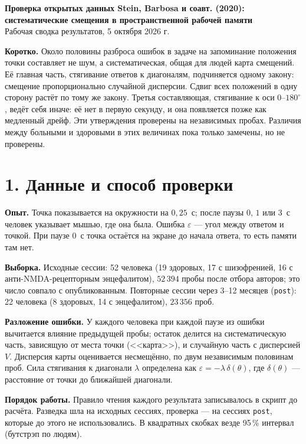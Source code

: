 \documentclass[10pt,a4paper]{article}
\newcommand{\gr}{^{\circ}}
\begin{document}
\begin{center}
{\Large\bfseries Проверка открытых данных Stein, Barbosa и соавт. (2020):\\[2pt]
систематические смещения в пространственной рабочей памяти}\\[6pt]
{\small Рабочая сводка результатов, 5 октября 2026 г.}
\end{center}

\textbf{Коротко.} Около половины разброса ошибок в задаче на запоминание положения точки составляет не шум,
а систематическая, общая для людей карта смещений. Её главная часть, стягивание ответов к диагоналям, подчиняется
одному закону: смещение пропорционально случайной дисперсии. Сдвиг всех положений в одну сторону растёт по тому же
закону. Третья составляющая, стягивание к оси $0$--$180\gr$, ведёт себя иначе: её нет в первую секунду, и она
появляется позже как медленный дрейф. Эти утверждения проверены на независимых пробах. Различия между больными и
здоровыми в этих величинах пока только замечены, но не проверены.

\section*{1. Данные и способ проверки}

\textbf{Опыт.} Точка показывается на окружности на $0,25$~с; после паузы $0$, $1$ или $3$~с человек указывает мышью,
где она была. Ошибка $\varepsilon$ --- угол между ответом и точкой. При паузе $0$~с точка остаётся на экране до начала
ответа, то есть памяти там нет.

\textbf{Выборка.} Исходные сессии: 52 человека (19 здоровых, 17 с шизофренией, 16 с анти-NMDA-рецепторным
энцефалитом), $52\,394$ пробы после отбора авторов; это число совпало с опубликованным. Повторные сессии через
3--12 месяцев (\texttt{post}): 22 человека (8 здоровых, 14 с энцефалитом), $23\,356$ проб.

\textbf{Разложение ошибки.} У каждого человека при каждой паузе из ошибки вычитается влияние предыдущей пробы; остаток
делится на систематическую часть, зависящую от места точки (<<карта>>), и случайную часть с дисперсией $V$. Дисперсия
карты оценивается несмещённо, по двум независимым половинам проб. Сила стягивания к диагонали $\lambda$ определена
как $\varepsilon=-\lambda\,\delta(\theta)$, где $\delta(\theta)$ --- расстояние от точки до ближайшей диагонали.

\textbf{Порядок работы.} Правило чтения каждого результата записывалось в скрипт до расчёта. Разведка шла на исходных
сессиях, проверка --- на сессиях \texttt{post}, которые до этого не использовались. В квадратных скобках везде 95\,\%
интервал (бутстрэп по людям).
\end{document}
